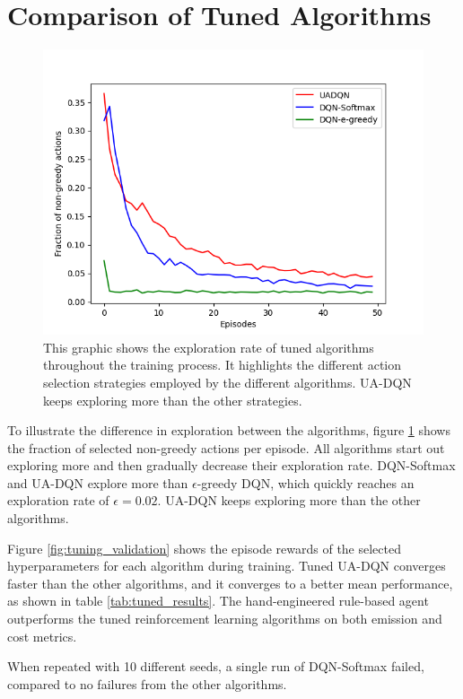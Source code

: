 \section{Comparison of Tuned Algorithms}
\begin{figure}
  \centering
  \includegraphics[width=\figurewidth]{figures/non-greedy-fraction.png}
  \caption{This graphic shows the exploration rate of tuned algorithms throughout the training process. It highlights the different action selection strategies employed by the different algorithms. UA-DQN keeps exploring more than the other strategies.}
  \label{fig:non_greedy_fraction}
\end{figure}
To illustrate the difference in exploration between the algorithms, figure \ref{fig:non_greedy_fraction} shows the fraction of selected non-greedy actions per episode.
All algorithms start out exploring more and then gradually decrease their exploration rate.
DQN-Softmax and UA-DQN explore more than $\epsilon$-greedy DQN, which quickly reaches an exploration rate of $\epsilon = 0.02$.
UA-DQN keeps exploring more than the other algorithms.

Figure \ref{fig:tuning_validation} shows the episode rewards of the selected hyperparameters for each algorithm during training.
Tuned UA-DQN converges faster than the other algorithms, and it converges to a better mean performance, as shown in table \ref{tab:tuned_results}. The hand-engineered rule-based agent outperforms the tuned reinforcement learning algorithms on both emission and cost metrics.

When repeated with 10 different seeds, a single run of DQN-Softmax failed, compared to no failures from the other algorithms.



